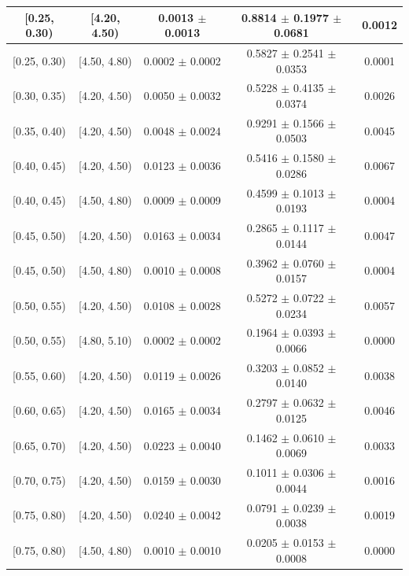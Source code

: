 \begin{longtable}{|c|c|c|c|c|}
\hline
\endlastfoot
[0.25, 0.30) & [4.20, 4.50) & 0.0013 $\pm$ 0.0013 & 0.8814 $\pm$ 0.1977 $\pm$ 0.0681 & 0.0012 \\ 
\hline
[0.25, 0.30) & [4.50, 4.80) & 0.0002 $\pm$ 0.0002 & 0.5827 $\pm$ 0.2541 $\pm$ 0.0353 & 0.0001 \\ 
\hline
[0.30, 0.35) & [4.20, 4.50) & 0.0050 $\pm$ 0.0032 & 0.5228 $\pm$ 0.4135 $\pm$ 0.0374 & 0.0026 \\ 
\hline
[0.35, 0.40) & [4.20, 4.50) & 0.0048 $\pm$ 0.0024 & 0.9291 $\pm$ 0.1566 $\pm$ 0.0503 & 0.0045 \\ 
\hline
[0.40, 0.45) & [4.20, 4.50) & 0.0123 $\pm$ 0.0036 & 0.5416 $\pm$ 0.1580 $\pm$ 0.0286 & 0.0067 \\ 
\hline
[0.40, 0.45) & [4.50, 4.80) & 0.0009 $\pm$ 0.0009 & 0.4599 $\pm$ 0.1013 $\pm$ 0.0193 & 0.0004 \\ 
\hline
[0.45, 0.50) & [4.20, 4.50) & 0.0163 $\pm$ 0.0034 & 0.2865 $\pm$ 0.1117 $\pm$ 0.0144 & 0.0047 \\ 
\hline
[0.45, 0.50) & [4.50, 4.80) & 0.0010 $\pm$ 0.0008 & 0.3962 $\pm$ 0.0760 $\pm$ 0.0157 & 0.0004 \\ 
\hline
[0.50, 0.55) & [4.20, 4.50) & 0.0108 $\pm$ 0.0028 & 0.5272 $\pm$ 0.0722 $\pm$ 0.0234 & 0.0057 \\ 
\hline
[0.50, 0.55) & [4.80, 5.10) & 0.0002 $\pm$ 0.0002 & 0.1964 $\pm$ 0.0393 $\pm$ 0.0066 & 0.0000 \\ 
\hline
[0.55, 0.60) & [4.20, 4.50) & 0.0119 $\pm$ 0.0026 & 0.3203 $\pm$ 0.0852 $\pm$ 0.0140 & 0.0038 \\ 
\hline
[0.60, 0.65) & [4.20, 4.50) & 0.0165 $\pm$ 0.0034 & 0.2797 $\pm$ 0.0632 $\pm$ 0.0125 & 0.0046 \\ 
\hline
[0.65, 0.70) & [4.20, 4.50) & 0.0223 $\pm$ 0.0040 & 0.1462 $\pm$ 0.0610 $\pm$ 0.0069 & 0.0033 \\ 
\hline
[0.70, 0.75) & [4.20, 4.50) & 0.0159 $\pm$ 0.0030 & 0.1011 $\pm$ 0.0306 $\pm$ 0.0044 & 0.0016 \\ 
\hline
[0.75, 0.80) & [4.20, 4.50) & 0.0240 $\pm$ 0.0042 & 0.0791 $\pm$ 0.0239 $\pm$ 0.0038 & 0.0019 \\ 
\hline
[0.75, 0.80) & [4.50, 4.80) & 0.0010 $\pm$ 0.0010 & 0.0205 $\pm$ 0.0153 $\pm$ 0.0008 & 0.0000 \\ 
\hline
\end{longtable}
